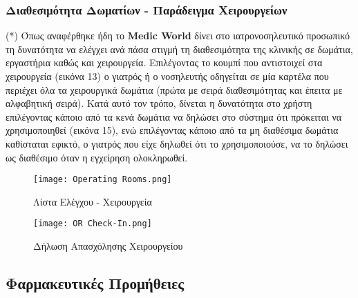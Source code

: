 \documentclass{article}
\begin{document}
\subsubsection{Διαθεσιμότητα Δωματίων - Παράδειγμα Χειρουργείων}
(*) Όπως αναφέρθηκε ήδη το \textbf{Medic World} δίνει στο ιατρονοσηλευτικό προσωπικό τη δυνατότητα να ελέγχει ανά πάσα στιγμή τη διαθεσιμότητα της κλινικής σε δωμάτια, εργαστήρια καθώς και χειρουργεία. 
Eπιλέγοντας το κουμπί που αντιστοιχεί στα χειρουργεία (εικόνα 13) ο γιατρός ή ο νοσηλευτής οδηγείται σε μία καρτέλα που περιέχει όλα τα χειρουργικά δωμάτια (πρώτα με σειρά διαθεσιμότητας και έπειτα με αλφαβητική σειρά). Κατά αυτό τον τρόπο, δίνεται η δυνατότητα στο χρήστη επιλέγοντας κάποιο από τα κενά δωμάτια να δηλώσει στο σύστημα ότι πρόκειται να χρησιμοποιηθεί (εικόνα 15), ενώ επιλέγοντας κάποιο από τα μη διαθέσιμα δωμάτια καθίσταται εφικτό, ο γιατρός που είχε δηλωθεί ότι το χρησιμοποιούσε, να το δηλώσει ως διαθέσιμο όταν η εγχείρηση ολοκληρωθεί.

\vspace{0.3cm}

\begin{figure}[!htb]
\centering
\texttt{[image: Operating Rooms.png]}
\caption{\label{fig:operating rooms} Λίστα Ελέγχου - Χειρουργεία}
\end{figure}

\vspace{0.3cm}

\begin{figure}[!htb]
\centering
\texttt{[image: OR Check-In.png]}
\caption{\label{fig:OR availability} Δήλωση Απασχόλησης Χειρουργείου}
\end{figure}

\subsection{Φαρμακευτικές Προμήθειες}
\end{document}
